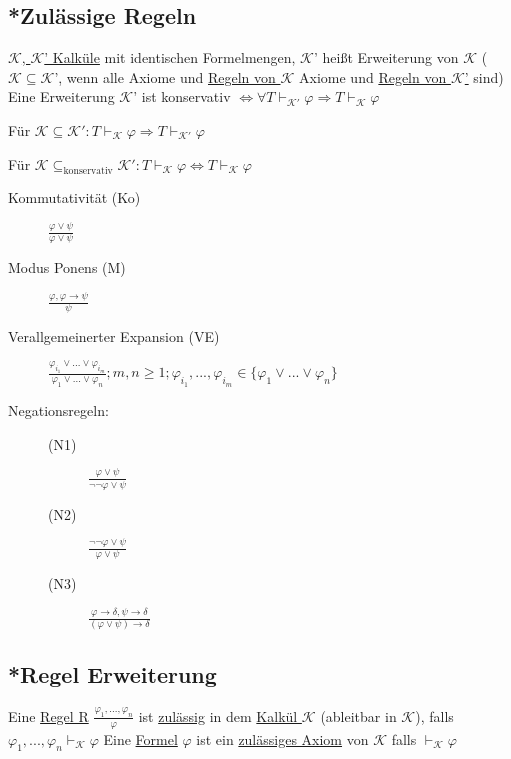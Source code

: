 \documentclass[12pt,a4paper]{article} %
\begin{document}
	\subsection{*Zulässige Regeln}
	\label{Zulassig}
	\hyperref[Kalkul]{$\mathcal{K}$, $\mathcal{K}$' Kalküle} mit identischen Formelmengen, $\mathcal{K}$' heißt Erweiterung von $\mathcal{K}$ ($\mathcal{K} \subseteq \mathcal{K}$', wenn alle Axiome und \hyperref[Kalkul]{Regeln von $\mathcal{K}$} Axiome und \hyperref[Kalkul]{Regeln von $\mathcal{K}$'} sind) \newline
	Eine Erweiterung $\mathcal{K}$' ist konservativ $\Leftrightarrow \forall T \hyperref[Beweisbar]{\vdash_{\mathcal{K}'}} \varphi \Rightarrow T \hyperref[Beweisbar]{\vdash_{\mathcal{K}}} \varphi$
	
	Für $\mathcal{K} \subseteq \mathcal{K}': T \hyperref[Beweisbar]{\vdash_{\mathcal{K}}} \varphi \Rightarrow T \hyperref[Beweisbar]{\vdash_{\mathcal{K}'}} \varphi$
	
	Für $\mathcal{K} \subseteq_{\text{konservativ}} \mathcal{K}': T \hyperref[Beweisbar]{\vdash_{\mathcal{K}}} \varphi \Leftrightarrow T \hyperref[Beweisbar]{\vdash_{\mathcal{K}}} \varphi$

	\begin{description}
		\item[Kommutativität (Ko)] $\frac{\varphi \lor \psi}{\varphi \lor \psi}$
		\item[Modus Ponens (M)] $\frac{\varphi, \varphi \rightarrow \psi}{\psi}$
		\item[Verallgemeinerter Expansion (VE)] $\frac{\varphi_{i_1} \lor ... \lor \varphi_{i_m}}{\varphi_1 \lor ... \lor \varphi_n}; m, n \ge 1; \varphi_{i_1}, ..., \varphi_{i_m} \in \{\varphi_1 \lor ... \lor \varphi_n\}$
		\item[Negationsregeln:] \begin{description}
			\item[(N1)] $\frac{\varphi \lor \psi}{\neg \neg \varphi \lor \psi}$
			\item[(N2)] $\frac{\neg \neg \varphi \lor \psi}{\varphi \lor \psi}$
			\item[(N3)] $\frac{\varphi \rightarrow \delta, \psi \rightarrow \delta}{(\varphi \lor \psi) \rightarrow \delta}$
		\end{description}
	\end{description}
	
	\subsection{*Regel Erweiterung}
	Eine \hyperref[Kalkul]{Regel R} $\frac{\varphi_1, ..., \varphi_n}{\varphi}$ ist \hyperref[Zulassig]{zulässig} in dem \hyperref[Kalkul]{Kalkül $\mathcal{K}$} (ableitbar in $\mathcal{K}$), falls $\varphi_1, ..., \varphi_n \hyperref[Beweisbar]{\vdash_{\mathcal{K}}} \varphi$ \newline
	Eine \hyperref[Formel]{Formel} $\varphi$ ist ein \hyperref[Zulassig]{zulässiges Axiom} von $\mathcal{K}$ falls $\hyperref[Beweisbar]{\vdash_{\mathcal{K}}} \varphi$
	
\end{document}
